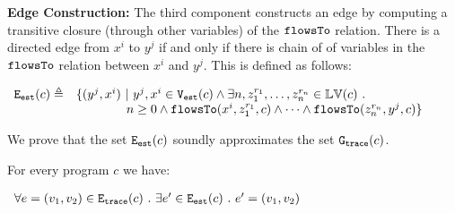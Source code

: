 \noindent\textbf{Edge Construction:} The third component constructs an edge by computing a transitive closure (through other variables) of the  
 $\mathtt{flowsTo}$ relation. There is a directed edge from  $x^i$ to $y^j$ if and only if there is chain of of variables 
    in the $\mathtt{flowsTo}$ relation between $x^i$ and $y^j$. This is defined as follows:
   \begin{center}
$
\begin{array}{cl}
    \mathtt{{E_{est}}}(c) \triangleq &
    \{ 
    (y^j, x^i)  ~ \vert ~ y^j, x^i \in \mathtt{{V_{est}}}(c)
    \land
      \exists n, z_1^{r_1}, \ldots, z_n^{r_n} \in \mathbb{LV}(c) ~.~ 
    \\ 
    & \qquad \qquad
      n \geq 0 \land
      \mathtt{flowsTo}(x^i,  z_1^{r_1}, c) 
      \land \cdots \land \mathtt{flowsTo}(z_n^{r_n}, y^j, c) 
    \}
    \end{array}
$
\end{center}    
We prove that the set $\mathtt{{E_{est}}}(c)$ soundly approximates the set $\mathtt{{G_{trace}}}(c)$.
	\begin{lem}
	\label{lem:edge_map}
	For every program $c$ we have:
   \begin{center}
$
	\begin{array}{l}
	\forall e = (v_1, v_2) \in \mathtt{{E_{trace}}}(c)
	~.~ 
	\exists e' \in \mathtt{{E_{est}}}(c) ~.~ e' = (v_1, v_2)
	\end{array}
$
\end{center} 
	\end{lem}

